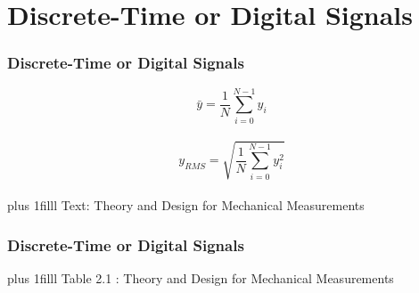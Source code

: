 \documentclass[fleqn]{beamer} %
\newcommand{\sectiontitleIV}{Discrete-Time or Digital Signals}
\newcommand{\btVFill}{\vskip0pt plus 1filll}
\begin{document}
\section{\sectiontitleIV}	

\begin{frame}[label=sectionIV] \small
\frametitle{\sectiontitleIV}
\bigskip

\[\bar{y}=\frac{1}{N}\sum\limits_{i=0}^{N-1} y_i\] \vspace{10mm}\\	
\[y_{RMS}=\sqrt{\frac{1}{N}\sum\limits_{i=0}^{N-1} y_i^2}\] \vspace{10mm}\\	

\btVFill
\tiny{Text: Theory and Design for Mechanical Measurements}	
\end{frame}

\begin{frame}[label=sectionIV] \small
\frametitle{\sectiontitleIV}
\bigskip



\btVFill
\tiny{Table 2.1 : Theory and Design for Mechanical Measurements}	
\end{frame}
\end{document}
